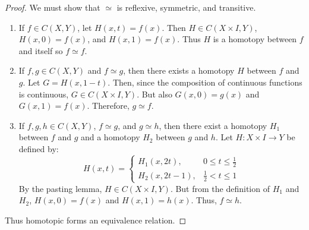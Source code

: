 \documentclass[crop=false,class=book,oneside]{standalone}
\begin{document}
            \begin{proof}
                We must show that $\simeq$ is reflexive,
                symmetric, and transitive.
                \begin{enumerate}
                    \item If ${f}\in{C(X,Y)}$,
                          let $H(x,t)=f(x)$. Then
                          $H\in{C({X}\times{I},Y)}$, $H(x,0)=f(x)$,
                          and $H(x,1)=f(x)$.
                          Thus $H$ is a homotopy between $f$ and
                          itself so $f\simeq f$.
                    \item If ${f,g}\in{C(X,Y)}$ and ${f}\simeq{g}$,
                          then there exists a homotopy $H$
                          between $f$ and $g$.
                          Let $G=H(x,1-t)$. Then, since the composition
                          of continuous functions is continuous,
                          $G\in{C({X}\times{I},Y)}$. But also
                          $G(x,0)=g(x)$ and $G(x,1)=f(x)$.
                          Therefore, ${g}\simeq{f}$.
                    \item If ${f,g,h}\in{C(X,Y)}$, ${f}\simeq{g}$,
                          and ${g}\simeq{h}$, then there exist a
                          homotopy $H_{1}$ between $f$ and $g$ and
                          a homotopy $H_{2}$ between $g$ and $h$.
                          Let $H:{X}\times{I}\rightarrow{Y}$
                          be defined by:
                          \begin{equation}
                            H(x,t)=
                            \begin{cases}
                                H_{1}(x,2t),
                                &{0}\leq{t}\leq\frac{1}{2}\\
                                H_{2}(x,2t-1),
                                &\frac{1}{2}<{t}\leq{1}
                            \end{cases}
                        \end{equation}
                          By the pasting lemma,
                          $H\in{C({X}\times{I},Y)}$.
                          But from the definition of $H_{1}$
                          and $H_{2}$, $H(x,0)=f(x)$ and $H(x,1)=h(x)$.
                          Thus, $f\simeq{h}$.
                \end{enumerate}
                Thus homotopic forms an equivalence relation.
            \end{proof}
\end{document}
